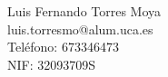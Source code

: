 Luis Fernando Torres Moya \\ %
luis.torresmo@alum.uca.es \\ %
Teléfono: 673346473 \\ %
NIF: 32093709S \\ %
